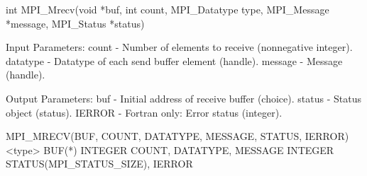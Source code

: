 int MPI_Mrecv(void *buf, int count, MPI_Datatype type,
    MPI_Message *message, MPI_Status *status)

Input Parameters:
count    - Number of elements to receive (nonnegative integer).
datatype - Datatype of each send buffer element (handle).
message  - Message (handle).

Output Parameters:
buf    - Initial address of receive buffer (choice).
status - Status object (status).
IERROR - Fortran only: Error status (integer).

MPI_MRECV(BUF, COUNT, DATATYPE, MESSAGE, STATUS, IERROR)
    <type>    BUF(*)
INTEGER    COUNT, DATATYPE, MESSAGE
INTEGER    STATUS(MPI_STATUS_SIZE), IERROR
